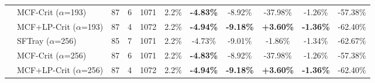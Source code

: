 \begin{table}[t]
{\begin{tabular}{ll|cccc|ccc|cc}
 & MCF-Crit ($\alpha$=193) & 87 & 6 & 1071 & 2.2\% & \textbf{-4.83\%} & -8.92\% & -37.98\% & -1.26\% & -57.38\% \\

 & MCF+LP-Crit ($\alpha$=193) & 87 & 4 & 1072 & 2.2\% & \textbf{-4.94\%} & \textbf{-9.18\%} & \textbf{+3.60\%} & \textbf{-1.36\%} & -62.40\% \\

\addlinespace[0.5em]

 & SFTray ($\alpha$=256) & 85 & 7 & 1071 & 2.2\% & -4.73\% & -9.01\% & -1.86\% & -1.34\% & -62.67\% \\

 & MCF-Crit ($\alpha$=256) & 87 & 6 & 1071 & 2.2\% & \textbf{-4.83\%} & -8.92\% & -37.98\% & -1.26\% & -57.38\% \\

 & MCF+LP-Crit ($\alpha$=256) & 87 & 4 & 1072 & 2.2\% & \textbf{-4.94\%} & \textbf{-9.18\%} & \textbf{+3.60\%} & \textbf{-1.36\%} & -62.40\% \\

\midrule

\bottomrule

\end{tabular}

}

\end{table}